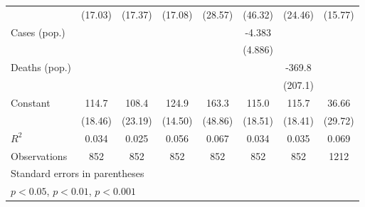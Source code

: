 \documentclass{article}
\begin{document}
{\begin{longtable}{l*{7}{c}}
                &  (17.03)         &  (17.37)         &  (17.08)         &  (28.57)         &  (46.32)         &  (24.46)         &  (15.77)         \\
Cases (pop.)    &                  &                  &                  &                  &   -4.383         &                  &                  \\
                &                  &                  &                  &                  &  (4.886)         &                  &                  \\
Deaths (pop.)   &                  &                  &                  &                  &                  &   -369.8         &                  \\
                &                  &                  &                  &                  &                  &  (207.1)         &                  \\
Constant        &    114.7\sym{**} &    108.4\sym{**} &    124.9\sym{***}&    163.3\sym{*}  &    115.0\sym{**} &    115.7\sym{**} &    36.66         \\
                &  (18.46)         &  (23.19)         &  (14.50)         &  (48.86)         &  (18.51)         &  (18.41)         &  (29.72)         \\
\hline
\(R^{2}\)       &    0.034         &    0.025         &    0.056         &    0.067         &    0.034         &    0.035         &    0.069         \\
Observations    &      852         &      852         &      852         &      852         &      852         &      852         &     1212         \\
\hline\hline
\multicolumn{8}{l}{\footnotesize Standard errors in parentheses}\\
\multicolumn{8}{l}{\footnotesize \sym{*} \(p<0.05\), \sym{**} \(p<0.01\), \sym{***} \(p<0.001\)}\\
\end{longtable}
}
\end{document}
